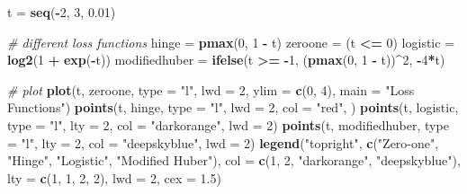 \documentclass[
]{book}
\newenvironment{Shaded}{\begin{snugshade}}{\end{snugshade}}
\newcommand{\AttributeTok}[1]{\textcolor[rgb]{0.13,0.29,0.53}{#1}}
\newcommand{\CommentTok}[1]{\textcolor[rgb]{0.56,0.35,0.01}{\textit{#1}}}
\newcommand{\DecValTok}[1]{\textcolor[rgb]{0.00,0.00,0.81}{#1}}
\newcommand{\FloatTok}[1]{\textcolor[rgb]{0.00,0.00,0.81}{#1}}
\newcommand{\FunctionTok}[1]{\textcolor[rgb]{0.13,0.29,0.53}{\textbf{#1}}}
\newcommand{\NormalTok}[1]{#1}
\newcommand{\OtherTok}[1]{\textcolor[rgb]{0.56,0.35,0.01}{#1}}
\newcommand{\SpecialCharTok}[1]{\textcolor[rgb]{0.81,0.36,0.00}{\textbf{#1}}}
\newcommand{\StringTok}[1]{\textcolor[rgb]{0.31,0.60,0.02}{#1}}
\theoremstyle{definition}
\theoremstyle{definition}
\theoremstyle{definition}
\theoremstyle{definition}
\theoremstyle{remark}
\begin{document}
\begin{Shaded}
\begin{Highlighting}[]
\NormalTok{  t }\OtherTok{=} \FunctionTok{seq}\NormalTok{(}\SpecialCharTok{{-}}\DecValTok{2}\NormalTok{, }\DecValTok{3}\NormalTok{, }\FloatTok{0.01}\NormalTok{)}

  \CommentTok{\# different loss functions}
\NormalTok{  hinge }\OtherTok{=} \FunctionTok{pmax}\NormalTok{(}\DecValTok{0}\NormalTok{, }\DecValTok{1} \SpecialCharTok{{-}}\NormalTok{ t) }
\NormalTok{  zeroone }\OtherTok{=}\NormalTok{ (t }\SpecialCharTok{\textless{}=} \DecValTok{0}\NormalTok{)}
\NormalTok{  logistic }\OtherTok{=} \FunctionTok{log2}\NormalTok{(}\DecValTok{1} \SpecialCharTok{+} \FunctionTok{exp}\NormalTok{(}\SpecialCharTok{{-}}\NormalTok{t))}
\NormalTok{  modifiedhuber }\OtherTok{=} \FunctionTok{ifelse}\NormalTok{(t }\SpecialCharTok{\textgreater{}=} \SpecialCharTok{{-}}\DecValTok{1}\NormalTok{, (}\FunctionTok{pmax}\NormalTok{(}\DecValTok{0}\NormalTok{, }\DecValTok{1} \SpecialCharTok{{-}}\NormalTok{ t))}\SpecialCharTok{\^{}}\DecValTok{2}\NormalTok{, }\SpecialCharTok{{-}}\DecValTok{4}\SpecialCharTok{*}\NormalTok{t)}
  
  \CommentTok{\# plot}
  \FunctionTok{plot}\NormalTok{(t, zeroone, }\AttributeTok{type =} \StringTok{"l"}\NormalTok{, }\AttributeTok{lwd =} \DecValTok{2}\NormalTok{, }\AttributeTok{ylim =} \FunctionTok{c}\NormalTok{(}\DecValTok{0}\NormalTok{, }\DecValTok{4}\NormalTok{),}
       \AttributeTok{main =} \StringTok{"Loss Functions"}\NormalTok{)}
  \FunctionTok{points}\NormalTok{(t, hinge, }\AttributeTok{type =} \StringTok{"l"}\NormalTok{, }\AttributeTok{lwd =} \DecValTok{2}\NormalTok{, }\AttributeTok{col =} \StringTok{"red"}\NormalTok{, )}
  \FunctionTok{points}\NormalTok{(t, logistic, }\AttributeTok{type =} \StringTok{"l"}\NormalTok{, }\AttributeTok{lty =} \DecValTok{2}\NormalTok{, }\AttributeTok{col =} \StringTok{"darkorange"}\NormalTok{, }\AttributeTok{lwd =} \DecValTok{2}\NormalTok{)}
  \FunctionTok{points}\NormalTok{(t, modifiedhuber, }\AttributeTok{type =} \StringTok{"l"}\NormalTok{, }\AttributeTok{lty =} \DecValTok{2}\NormalTok{, }\AttributeTok{col =} \StringTok{"deepskyblue"}\NormalTok{, }\AttributeTok{lwd =} \DecValTok{2}\NormalTok{)}
  \FunctionTok{legend}\NormalTok{(}\StringTok{"topright"}\NormalTok{, }\FunctionTok{c}\NormalTok{(}\StringTok{"Zero{-}one"}\NormalTok{, }\StringTok{"Hinge"}\NormalTok{, }\StringTok{"Logistic"}\NormalTok{, }\StringTok{"Modified Huber"}\NormalTok{),}
         \AttributeTok{col =} \FunctionTok{c}\NormalTok{(}\DecValTok{1}\NormalTok{, }\DecValTok{2}\NormalTok{, }\StringTok{"darkorange"}\NormalTok{, }\StringTok{"deepskyblue"}\NormalTok{), }\AttributeTok{lty =} \FunctionTok{c}\NormalTok{(}\DecValTok{1}\NormalTok{, }\DecValTok{1}\NormalTok{, }\DecValTok{2}\NormalTok{, }\DecValTok{2}\NormalTok{), }
         \AttributeTok{lwd =} \DecValTok{2}\NormalTok{, }\AttributeTok{cex =} \FloatTok{1.5}\NormalTok{)}
\end{Highlighting}
\end{Shaded}
\end{document}
